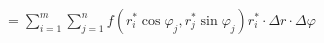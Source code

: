 \documentclass[preview]{standalone}
\begin{document}
\begin{align*}
= \sum_{i=1}^m \sum_{j=1}^n f \left( r_i^* \cos \varphi_j, r_j^* \sin \varphi_j \right) r_i^* \cdot \Delta r \cdot \Delta \varphi
\end{align*}
\end{document}
